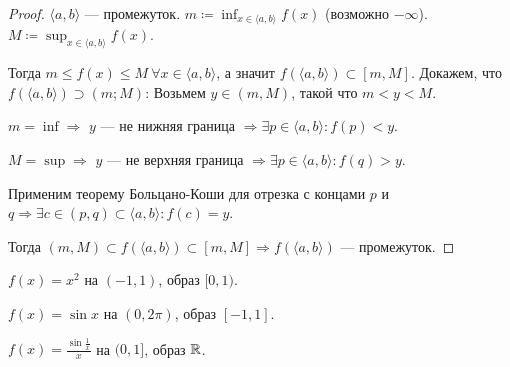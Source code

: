 \begin{proof}
    $\langle a, b \rangle$ --- промежуток.  $m \coloneqq \inf_{x \in \langle a, b \rangle} f(x)$ (возможно $-\infty$). $M \coloneqq \sup_{x \in \langle a, b \rangle} f(x)$.

    Тогда  $m \le f(x) \le M\ \forall x \in \langle a, b \rangle$, а значит $f(\langle a, b \rangle) \subset [m, M]$. 
Докажем, что $f(\langle a, b \rangle) \supset (m; M)$:
    Возьмем  $y \in (m, M)$, такой что  $m < y < M$.  

    $m = \inf \Rightarrow$ $y$ ---  не нижняя граница $\Rightarrow \exists p \in \langle a, b \rangle\!: f(p) < y$. 

    $M = \sup \Rightarrow$ $y$ ---  не верхняя граница $\Rightarrow \exists p \in \langle a, b \rangle\!: f(q) > y$.

    Применим теорему Больцано-Коши для отрезка с концами $p$ и  $q \Rightarrow \exists c \in (p, q) \subset \langle a, b \rangle\!: f(c)=y$. 

    Тогда $(m, M) \subset f(\langle a, b \rangle) \subset [m, M] \Rightarrow f(\langle a, b \rangle)$ --- промежуток. 
\end{proof}
\begin{remark}
    $f(x) = x^2$ на  $(-1, 1)$, образ  $[0, 1)$.

    $f(x) = \sin x$ на  $(0, 2\pi)$, образ $[-1, 1]$.

    $f(x) = \frac{\sin \frac{1}{x}}{x}$ на $(0, 1]$, образ  $\mathbb{R}$.
\end{remark}


